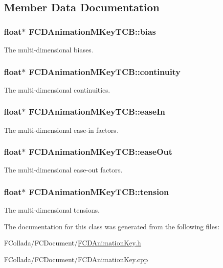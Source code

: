 \subsection{Member Data Documentation}
\hypertarget{classFCDAnimationMKeyTCB_ae3812b7c36b879e9fd9ecfe67120c219}{
\subsubsection[{bias}]{\setlength{\rightskip}{0pt plus 5cm}float$\ast$ {\bf FCDAnimationMKeyTCB::bias}}}
\label{classFCDAnimationMKeyTCB_ae3812b7c36b879e9fd9ecfe67120c219}
The multi-\/dimensional biases. \hypertarget{classFCDAnimationMKeyTCB_aad952e9ad96796b79ffbd7ea15fa4ce7}{
\subsubsection[{continuity}]{\setlength{\rightskip}{0pt plus 5cm}float$\ast$ {\bf FCDAnimationMKeyTCB::continuity}}}
\label{classFCDAnimationMKeyTCB_aad952e9ad96796b79ffbd7ea15fa4ce7}
The multi-\/dimensional continuities. \hypertarget{classFCDAnimationMKeyTCB_a7e35030931711b58ae099eee73d05102}{
\subsubsection[{easeIn}]{\setlength{\rightskip}{0pt plus 5cm}float$\ast$ {\bf FCDAnimationMKeyTCB::easeIn}}}
\label{classFCDAnimationMKeyTCB_a7e35030931711b58ae099eee73d05102}
The multi-\/dimensional ease-\/in factors. \hypertarget{classFCDAnimationMKeyTCB_a9cea41d40b917bc3f5151320318c49fe}{
\subsubsection[{easeOut}]{\setlength{\rightskip}{0pt plus 5cm}float$\ast$ {\bf FCDAnimationMKeyTCB::easeOut}}}
\label{classFCDAnimationMKeyTCB_a9cea41d40b917bc3f5151320318c49fe}
The multi-\/dimensional ease-\/out factors. \hypertarget{classFCDAnimationMKeyTCB_a05aa82c6e377a34c8d4c521f05739070}{
\subsubsection[{tension}]{\setlength{\rightskip}{0pt plus 5cm}float$\ast$ {\bf FCDAnimationMKeyTCB::tension}}}
\label{classFCDAnimationMKeyTCB_a05aa82c6e377a34c8d4c521f05739070}
The multi-\/dimensional tensions. 

The documentation for this class was generated from the following files:\begin{DoxyCompactItemize}
\item 
FCollada/FCDocument/\hyperlink{FCDAnimationKey_8h}{FCDAnimationKey.h}\item 
FCollada/FCDocument/FCDAnimationKey.cpp\end{DoxyCompactItemize}

